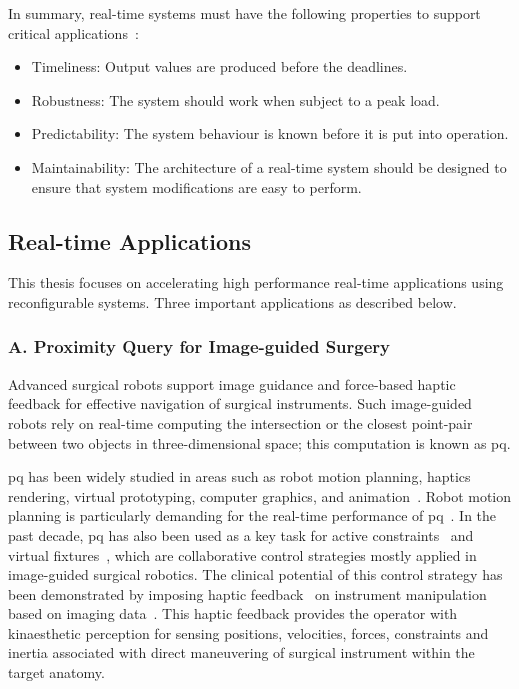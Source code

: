 In summary, real-time systems must have the following properties to support critical applications~\cite{buttazzo11}:
\begin{itemize}
\item Timeliness: Output values are produced before the deadlines.
\item Robustness: The system should work when subject to a peak load.
\item Predictability: The system behaviour is known before it is put into operation.
\item Maintainability: The architecture of a real-time system should be designed to ensure that system modifications are easy to perform.
\end{itemize}

\subsection{Real-time Applications}

This thesis focuses on accelerating high performance real-time applications using reconfigurable systems. Three important applications as described below.

\subsubsection{A. Proximity Query for Image-guided Surgery}

Advanced surgical robots support image guidance and force-based haptic feedback for effective navigation of surgical instruments. 
Such image-guided robots rely on real-time computing the intersection or the closest point-pair
between two objects in three-dimensional space; 
this computation is known as \gls{pq}.

\gls{pq} has been widely studied in areas such as robot motion planning, haptics rendering, virtual prototyping, computer graphics, and animation~\cite{gilbert90}.
Robot motion planning is particularly demanding for the real-time performance of \gls{pq}~\cite{chakraborty08}. 
In the past decade, \gls{pq} has also been used as a key task for active constraints~\cite{kwok10} and virtual fixtures~\cite{li07}, which are collaborative control strategies mostly applied in image-guided surgical robotics. 
The clinical potential of this control strategy has been demonstrated by imposing haptic feedback~\cite{constantinescu05} on instrument manipulation based on imaging data~\cite{jakopec03}.
This haptic feedback provides the operator with kinaesthetic perception for sensing positions, velocities, forces, constraints and inertia associated with direct maneuvering of surgical
instrument within the target anatomy.

